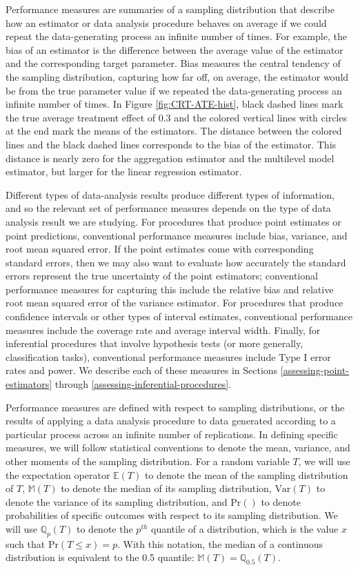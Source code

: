\documentclass[
]{book}
\newcommand{\Prob}{\text{Pr}}
\newcommand{\E}{\mathbb{E}}
\newcommand{\M}{\mathbb{M}}
\newcommand{\Q}{\mathbb{Q}}
\newcommand{\Var}{\text{Var}}
\begin{document}
Performance measures are summaries of a sampling distribution that describe how an estimator or data analysis procedure behaves on average if we could repeat the data-generating process an infinite number of times.
For example, the bias of an estimator is the difference between the average value of the estimator and the corresponding target parameter.
Bias measures the central tendency of the sampling distribution, capturing how far off, on average, the estimator would be from the true parameter value if we repeated the data-generating process an infinite number of times.
In Figure \ref{fig:CRT-ATE-hist}, black dashed lines mark the true average treatment effect of 0.3 and the colored vertical lines with circles at the end mark the means of the estimators.
The distance between the colored lines and the black dashed lines corresponds to the bias of the estimator.
This distance is nearly zero for the aggregation estimator and the multilevel model estimator, but larger for the linear regression estimator.

Different types of data-analysis results produce different types of information, and so the relevant set of performance measures depends on the type of data analysis result we are studying.
For procedures that produce point estimates or point predictions, conventional performance measures include bias, variance, and root mean squared error.
If the point estimates come with corresponding standard errors, then we may also want to evaluate how accurately the standard errors represent the true uncertainty of the point estimators; conventional performance measures for capturing this include the relative bias and relative root mean squared error of the variance estimator.
For procedures that produce confidence intervals or other types of interval estimates, conventional performance measures include the coverage rate and average interval width.
Finally, for inferential procedures that involve hypothesis tests (or more generally, classification tasks), conventional performance measures include Type I error rates and power.
We describe each of these measures in Sections \ref{assessing-point-estimators} through \ref{assessing-inferential-procedures}.

Performance measures are defined with respect to sampling distributions, or the results of applying a data analysis procedure to data generated according to a particular process across an infinite number of replications.
In defining specific measures, we will follow statistical conventions to denote the mean, variance, and other moments of the sampling distribution.
For a random variable \(T\), we will use the expectation operator \(\E(T)\) to denote the mean of the sampling distribution of \(T\), \(\M(T)\) to denote the median of its sampling distribution, \(\Var(T)\) to denote the variance of its sampling distribution, and \(\Prob()\) to denote probabilities of specific outcomes with respect to its sampling distribution.
We will use \(\Q_p(T)\) to denote the \(p^{th}\) quantile of a distribution, which is the value \(x\) such that \(\Prob(T \leq x) = p\). With this notation, the median of a continuous distribution is equivalent to the 0.5 quantile: \(\M(T) = \Q_{0.5}(T)\).
\end{document}
